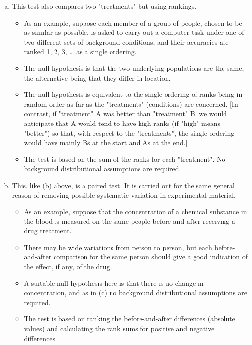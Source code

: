 \documentclass[a4paper,12pt]{article}
\begin{document}
\begin{enumerate}[(a)]
\item  This test also compares two "treatments" but using rankings. 
\begin{itemize}
    \item  As an example, suppose each member of a group of people, chosen to be as similar as possible, is asked to carry out a computer task under one of two different sets of background conditions, and their accuracies are ranked 1, 2, 3, … as a single ordering.  
    \item The null hypothesis is that the two underlying populations are the same, the alternative being that they differ in location.  
    \item The null hypothesis is equivalent to the single ordering of ranks being in random order as far as the "treatments" (conditions) are concerned.  [In contrast, if "treatment" A was better than "treatment" B, we would anticipate that A would tend to have high ranks (if "high" means "better") so that, with respect to the "treatments", the single ordering would have mainly Bs at the start and As at the end.] 
    \item The test is based on the sum of the ranks for each "treatment".  No background distributional assumptions are required. 
\end{itemize}

 
\item  This, like (b) above, is a paired test.  It is carried out for the same general reason of removing possible systematic variation in experimental material. 
\begin{itemize}
    \item  As an example, suppose that the concentration of a chemical substance in the blood is measured on the same people before and after receiving a drug treatment.  
    \item There may be wide variations from person to person, but each before-and-after comparison for the same person should give a good indication of the effect, if any, of the drug. 
    \item A suitable null hypothesis here is that there is no change in concentration, and as in (c) no background distributional assumptions are required. 
    \item The test is based on ranking the before-and-after differences (absolute values) and calculating the rank sums for positive and negative differences. 
\end{itemize}


\end{enumerate}
\end{document}
